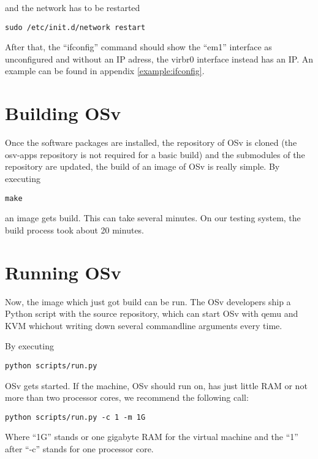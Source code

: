         and the network has to be restarted

\begin{lstlisting}
sudo /etc/init.d/network restart
\end{lstlisting}

        After that, the ``ifconfig'' command should show the ``em1'' interface
        as unconfigured and without an IP adress, the virbr0 interface instead
        has an IP. An example can be found in appendix \ref{example:ifconfig}.


\chapter{Building OSv}

    Once the software packages are installed, the repository of OSv is
    cloned (the osv-apps repository is not required for a basic build) and
    the submodules of the repository are updated, the build of an image of
    OSv is really simple. By executing

\begin{lstlisting}
make
\end{lstlisting}

    an image gets build. This can take several minutes. On our testing
    system, the build process took about 20 minutes.

\chapter{Running OSv}

    Now, the image which just got build can be run. The OSv developers ship a
    Python script with the source repository, which can start OSv with qemu and
    KVM whichout writing down several commandline arguments every time.

    By executing

\begin{lstlisting}
python scripts/run.py
\end{lstlisting}

    OSv gets started. If the machine, OSv should run on, has just little RAM or
    not more than two processor cores, we recommend the following call:

\begin{lstlisting}
python scripts/run.py -c 1 -m 1G
\end{lstlisting}

    Where ``1G'' stands or one gigabyte RAM for the virtual machine and the
    ``1'' after  ``-c'' stands for one processor core.

